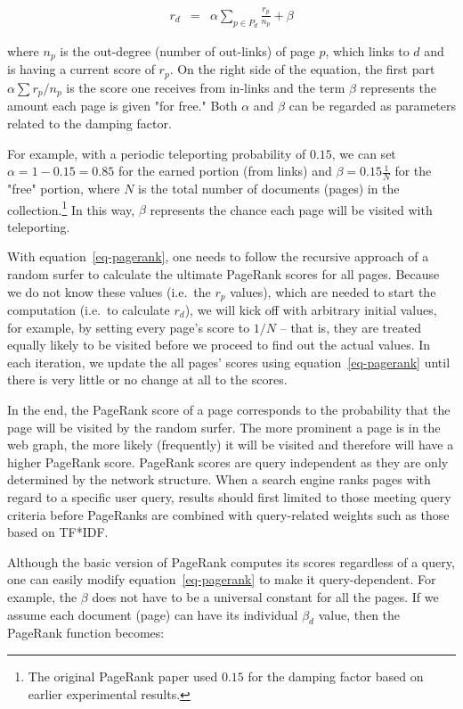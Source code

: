 \documentclass[
  letterpaper,
]{scrbook}
\begin{document}
\[\begin{aligned}
r_d & = & \alpha \sum_{p \in P_d} \frac{r_p}{n_p} + \beta
\end{aligned}\]

where \(n_p\) is the out-degree (number of out-links) of page \(p\),
which links to \(d\) and is having a current score of \(r_p\). On the
right side of the equation, the first part \(\alpha \sum r_p /n_p\) is
the score one receives from in-links and the term \(\beta\) represents
the amount each page is given "for free." Both \(\alpha\) and \(\beta\)
can be regarded as parameters related to the damping factor.

For example, with a periodic teleporting probability of \(0.15\), we can
set \(\alpha = 1 - 0.15 = 0.85\) for the earned portion (from links) and
\(\beta = 0.15 \frac{1}{N}\) for the "free" portion, where \(N\) is the
total number of documents (pages) in the collection.\footnote{The
  original PageRank paper used \(0.15\) for the damping factor based on
  earlier experimental results.} In this way, \(\beta\) represents the
chance each page will be visited with teleporting.

With equation~\hyperref[eq-pagerank]{{[}eq-pagerank{]}}, one needs to
follow the recursive approach of a random surfer to calculate the
ultimate PageRank scores for all pages. Because we do not know these
values (i.e.~the \(r_p\) values), which are needed to start the
computation (i.e.~to calculate \(r_d\)), we will kick off with arbitrary
initial values, for example, by setting every page's score to \(1/N\) --
that is, they are treated equally likely to be visited before we proceed
to find out the actual values. In each iteration, we update the all
pages' scores using equation~\hyperref[eq-pagerank]{{[}eq-pagerank{]}}
until there is very little or no change at all to the scores.

In the end, the PageRank score of a page corresponds to the probability
that the page will be visited by the random surfer. The more prominent a
page is in the web graph, the more likely (frequently) it will be
visited and therefore will have a higher PageRank score. PageRank scores
are query independent as they are only determined by the network
structure. When a search engine ranks pages with regard to a specific
user query, results should first limited to those meeting query criteria
before PageRanks are combined with query-related weights such as those
based on TF*IDF.

Although the basic version of PageRank computes its scores regardless of
a query, one can easily modify
equation~\hyperref[eq-pagerank]{{[}eq-pagerank{]}} to make it
query-dependent. For example, the \(\beta\) does not have to be a
universal constant for all the pages. If we assume each document (page)
can have its individual \(\beta_d\) value, then the PageRank function
becomes:
\end{document}
